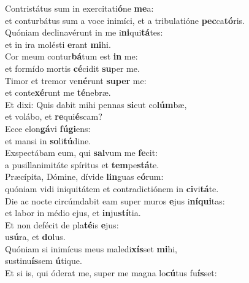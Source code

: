 \evenverse Contristátus sum in exercitati\textbf{ó}ne \textbf{me}a:~\*\\
\evenverse et conturbátus sum a voce inimíci, et a tribulatióne \textbf{pec}ca\textbf{tó}ris.\\
\oddverse Quóniam declinavérunt in me i\textbf{ni}qui\textbf{tá}tes:~\*\\
\oddverse et in ira molésti \textbf{e}rant \textbf{mi}hi.\\
\evenverse Cor meum contur\textbf{bá}tum est \textbf{in} me:~\*\\
\evenverse et formído mortis \textbf{cé}cidit \textbf{su}per me.\\
\oddverse Timor et tremor ve\textbf{né}runt \textbf{su}\textbf{per} me:~\*\\
\oddverse et conte\textbf{xé}runt me \textbf{té}nebræ.\\
\evenverse Et dixi: Quis dabit mihi pennas \textbf{si}cut co\textbf{lúm}bæ,~\*\\
\evenverse et volábo, et \textbf{re}qui\textbf{é}scam?\\
\oddverse Ecce elon\textbf{gá}vi \textbf{fú}\textbf{gi}ens:~\*\\
\oddverse et mansi in \textbf{so}li\textbf{tú}dine.\\
\evenverse Exspectábam eum, qui \textbf{sal}vum me \textbf{fe}cit:~\*\\
\evenverse a pusillanimitáte spíritus et \textbf{tem}pe\textbf{stá}te.\\
\oddverse Præcípita, Dómine, dívide \textbf{lin}guas e\textbf{ó}rum:~\*\\
\oddverse quóniam vidi iniquitátem et contradictiónem in \textbf{ci}vi\textbf{tá}te.\\
\evenverse Die ac nocte circúmdabit eam super muros \textbf{e}jus i\textbf{ní}\textbf{qui}tas:~\*\\
\evenverse et labor in médio ejus, et \textbf{in}ju\textbf{stí}tia.\\
\oddverse Et non defécit de pla\textbf{té}is \textbf{e}jus:~\*\\
\oddverse u\textbf{sú}ra, et \textbf{do}lus.\\
\evenverse Quóniam si inimícus meus maledi\textbf{xís}set \textbf{mi}hi,~\*\\
\evenverse sustinu\textbf{ís}sem \textbf{ú}tique.\\
\oddverse Et si is, qui óderat me, super me magna lo\textbf{cú}tus fu\textbf{ís}set:~\*\\
